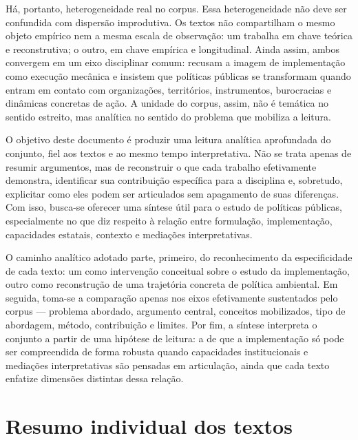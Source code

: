 \documentclass[12pt,a4paper]{article}
\begin{document}
Há, portanto, heterogeneidade real no corpus. Essa heterogeneidade não deve ser confundida com dispersão improdutiva. Os textos não compartilham o mesmo objeto empírico nem a mesma escala de observação: um trabalha em chave teórica e reconstrutiva; o outro, em chave empírica e longitudinal. Ainda assim, ambos convergem em um eixo disciplinar comum: recusam a imagem de implementação como execução mecânica e insistem que políticas públicas se transformam quando entram em contato com organizações, territórios, instrumentos, burocracias e dinâmicas concretas de ação. A unidade do corpus, assim, não é temática no sentido estreito, mas analítica no sentido do problema que mobiliza a leitura. \parencite{ascenzi2013_implementacao_politicas,mello2017_evolucao_plano}

O objetivo deste documento é produzir uma leitura analítica aprofundada do conjunto, fiel aos textos e ao mesmo tempo interpretativa. Não se trata apenas de resumir argumentos, mas de reconstruir o que cada trabalho efetivamente demonstra, identificar sua contribuição específica para a disciplina e, sobretudo, explicitar como eles podem ser articulados sem apagamento de suas diferenças. Com isso, busca-se oferecer uma síntese útil para o estudo de políticas públicas, especialmente no que diz respeito à relação entre formulação, implementação, capacidades estatais, contexto e mediações interpretativas. \parencite{ascenzi2013_implementacao_politicas,mello2017_evolucao_plano}

O caminho analítico adotado parte, primeiro, do reconhecimento da especificidade de cada texto: um como intervenção conceitual sobre o estudo da implementação, outro como reconstrução de uma trajetória concreta de política ambiental. Em seguida, toma-se a comparação apenas nos eixos efetivamente sustentados pelo corpus — problema abordado, argumento central, conceitos mobilizados, tipo de abordagem, método, contribuição e limites. Por fim, a síntese interpreta o conjunto a partir de uma hipótese de leitura: a de que a implementação só pode ser compreendida de forma robusta quando capacidades institucionais e mediações interpretativas são pensadas em articulação, ainda que cada texto enfatize dimensões distintas dessa relação. \parencite{ascenzi2013_implementacao_politicas,mello2017_evolucao_plano}



\section{Resumo individual dos textos}
\label{sec:orgc26568b}
\end{document}
